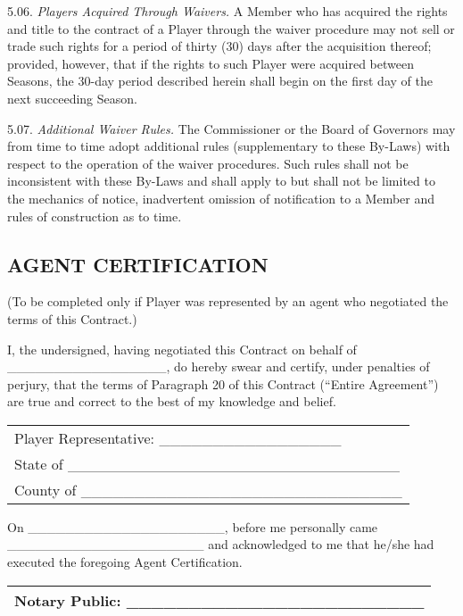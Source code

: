 \documentclass[
]{book}
\begin{document}
5.06. \emph{Players Acquired Through Waivers.} A Member who has acquired the rights and title to the contract of a Player through the waiver procedure may not sell or trade such rights for a period of thirty (30) days after the acquisition thereof; provided, however, that if the rights to such Player were acquired between Seasons, the 30-day period described herein shall begin on the first day of the next succeeding Season.

5.07. \emph{Additional Waiver Rules.} The Commissioner or the Board of Governors may from time to time adopt additional rules (supplementary to these By-Laws) with respect to the operation of the waiver procedures. Such rules shall not be inconsistent with these By-Laws and shall apply to but shall not be limited to the mechanics of notice, inadvertent omission of notification to a Member and rules of construction as to time.

\newpage

\hypertarget{agent-certification}{%
\subsection{AGENT CERTIFICATION}\label{agent-certification}}

(To be completed only if Player was represented by an agent who negotiated the terms of this Contract.)

I, the undersigned, having negotiated this Contract on behalf of \_\_\_\_\_\_\_\_\_\_\_\_\_\_\_\_\_, do hereby swear and certify, under penalties of perjury, that the terms of Paragraph 20 of this Contract (``Entire Agreement'') are true and correct to the best of my knowledge and belief.

\begin{longtable}[]{@{}l@{}}
\toprule()
\endhead
Player Representative: \_\_\_\_\_\_\_\_\_\_\_\_\_\_\_\_\_ \\
State of \_\_\_\_\_\_\_\_\_\_\_\_\_\_\_\_\_\_\_\_\_\_\_\_\_\_\_\_\_\_\_ \\
County of \_\_\_\_\_\_\_\_\_\_\_\_\_\_\_\_\_\_\_\_\_\_\_\_\_\_\_\_\_\_ \\
\bottomrule()
\end{longtable}

On \_\_\_\_\_\_\_\_\_\_\_\_\_\_\_\_\_\_\_\_\_, before me personally came \_\_\_\_\_\_\_\_\_\_\_\_\_\_\_\_\_\_\_\_\_ and acknowledged to me that he/she had executed the foregoing Agent Certification.

\begin{longtable}[]{@{}l@{}}
\toprule()
\endhead
Notary Public: \_\_\_\_\_\_\_\_\_\_\_\_\_\_\_\_\_\_\_\_\_\_\_\_ \\
\bottomrule()
\end{longtable}
\end{document}
